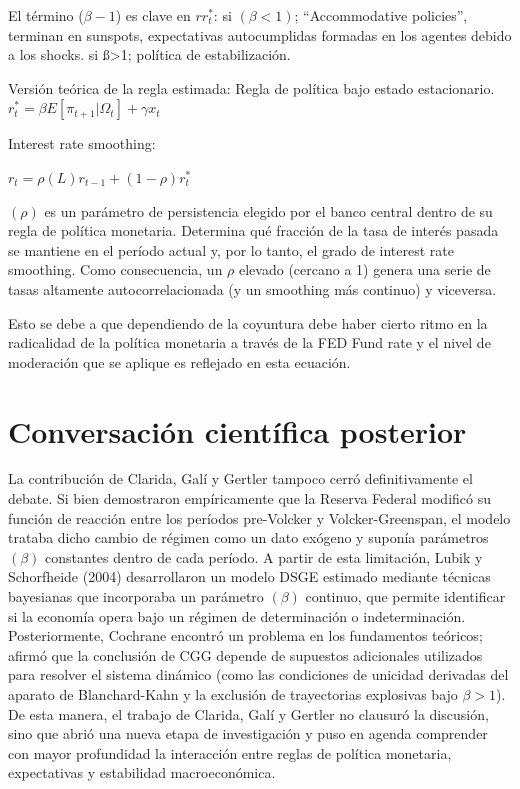 \documentclass[12pt]{article}
\begin{document}
El término ($\beta-1$) es clave en $rr^*_t$:
\vspace{1em}
si $(\beta<1)$; “Accommodative policies”, terminan en sunspots, expectativas autocumplidas formadas en los agentes debido a los shocks.
si ß>1; política de estabilización.

\vspace{1em}

Versión teórica de la regla estimada: Regla de política bajo estado estacionario.
$r^*_t=\beta E[\pi_{t+1}|\Omega_t]+\gamma x_t$

\vspace{1em}

Interest rate smoothing:

\vspace{1em}

$r_t= \rho(L)r_{t-1}+(1-\rho)r^*_t$

\vspace{1em}

\indent $(\rho)$ es un parámetro de persistencia elegido por el banco central dentro de su regla de política monetaria. Determina qué fracción de la tasa de interés pasada se mantiene en el período actual y, por lo tanto, el grado de interest rate smoothing. Como consecuencia, un $\rho$ elevado (cercano a 1) genera una serie de tasas altamente autocorrelacionada (y un smoothing más continuo) y viceversa.

\vspace{1em}

\indent Esto se debe a que dependiendo de la coyuntura debe haber cierto ritmo en la radicalidad de la política monetaria a través de la FED Fund rate y el nivel de moderación que se aplique es reflejado en esta ecuación.

\vspace{1em}

\section*{Conversación científica posterior}

\indent La contribución de Clarida, Galí y Gertler tampoco cerró definitivamente el debate. Si bien demostraron empíricamente que la Reserva Federal modificó su función de reacción entre los períodos pre-Volcker y Volcker-Greenspan, el modelo trataba dicho cambio de régimen como un dato exógeno y suponía parámetros $(\beta)$ constantes dentro de cada período. A partir de esta limitación, Lubik y Schorfheide (2004) desarrollaron un modelo DSGE estimado mediante técnicas bayesianas que incorporaba un parámetro $(\beta)$ continuo, que permite identificar si la economía opera bajo un régimen de determinación o indeterminación. Posteriormente, Cochrane encontró un problema en los fundamentos teóricos; afirmó que la conclusión de CGG depende de supuestos adicionales utilizados para resolver el sistema dinámico (como las condiciones de unicidad derivadas del aparato de Blanchard-Kahn y la exclusión de trayectorias explosivas bajo $\beta>1$). De esta manera, el trabajo de Clarida, Galí y Gertler no clausuró la discusión, sino que abrió una nueva etapa de investigación y puso en agenda comprender con mayor profundidad la interacción entre reglas de política monetaria, expectativas y estabilidad macroeconómica.
\end{document}
